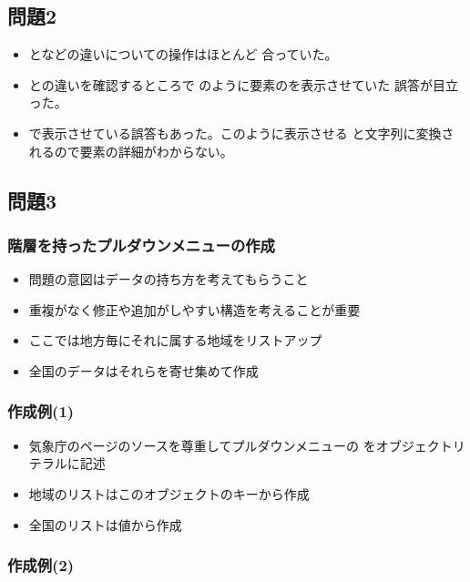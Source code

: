  \subsection{問題2}
  \begin{frame}[containsverbatim]
   \begin{itemize}
    \item {}となどの違いについての操作はほとんど
          合っていた。
    \item {}との違いを確認するところで
          のように要素のを表示させていた
          誤答が目立った。
    \item {}で表示させている誤答もあった。このように表示させる
          と文字列に変換されるので要素の詳細がわからない。
   \end{itemize}
  \end{frame}
  \subsection{問題3}
  \begin{frame}[containsverbatim]
   \frametitle{階層を持ったプルダウンメニューの作成}
   \begin{itemize}
    \item 問題の意図はデータの持ち方を考えてもらうこと
    \item 重複がなく修正や追加がしやすい構造を考えることが重要
    \item ここでは地方毎にそれに属する地域をリストアップ
    \item 全国のデータはそれらを寄せ集めて作成
   \end{itemize}
  \end{frame}
  \begin{frame}[containsverbatim]
   \frametitle{作成例(1)}
   \begin{itemize}
    \item 気象庁のページのソースを尊重してプルダウンメニューの
          をオブジェクトリテラルに記述
    \item 地域のリストはこのオブジェクトのキーから作成
    \item 全国のリストは値から作成
   \end{itemize}
  \end{frame}
  \begin{frame}[containsverbatim]
   \frametitle{作成例(2)}
  \end{frame}
